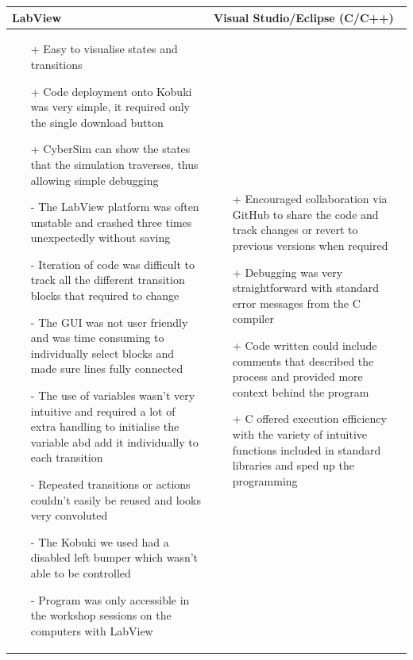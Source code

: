 \begin{table}[!ht]
    \centering
    \begin{tabularx}{\textwidth}{|X|X|}
        \hline
        \textbf{LabView} & \textbf{Visual Studio/Eclipse (C/C++)}\\
        \hline
        \begin{itemize}
            \item[+] Easy to visualise states and transitions
            \item[+] Code deployment onto Kobuki was very simple, it required only the single download button
            \item[+] CyberSim can show the states that the simulation traverses, thus allowing simple debugging
            \item[-] The LabView platform was often unstable and crashed three times unexpectedly without saving
            \item[-] Iteration of code was difficult to track all the different transition blocks that required to change
            \item[-] The GUI was not user friendly and was time consuming to individually select blocks and made sure lines fully connected
            \item[-] The use of variables wasn't very intuitive and required a lot of extra handling to initialise the variable abd add it individually to each transition
            \item[-] Repeated transitions or actions couldn't easily be reused and looks very convoluted
            \item[-] The Kobuki we used had a disabled left bumper which wasn't able to be controlled
            \item[-] Program was only accessible in the workshop sessions on the computers with LabView
        \end{itemize}
        &
        \begin{itemize}
            \item[+] Encouraged collaboration via GitHub to share the code and track changes or revert to previous versions when required
            \item[+] Debugging was very straightforward with standard error messages from the C compiler
            \item[+] Code written could include comments that described the process and provided more context behind the program
            \item[+] C offered execution efficiency with the variety of intuitive functions included in standard libraries and sped up the programming

\end{itemize}
\end{tabularx}
\end{table}
